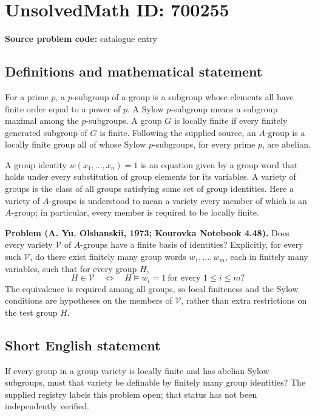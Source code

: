 \documentclass[11pt]{article}
\begin{document}
\section*{UnsolvedMath ID: 700255}
\textbf{Source problem code:} catalogue entry
\subsection{Definitions and mathematical statement}
For a prime \(p\), a \(p\)-subgroup of a group is a subgroup whose elements all have finite order equal to a power of \(p\). A Sylow \(p\)-subgroup means a subgroup maximal among the \(p\)-subgroups. A group \(G\) is locally finite if every finitely generated subgroup of \(G\) is finite. Following the supplied source, an \(A\)-group is a locally finite group all of whose Sylow \(p\)-subgroups, for every prime \(p\), are abelian.

A group identity \(w(x_1,\ldots,x_n)=1\) is an equation given by a group word that holds under every substitution of group elements for its variables. A variety of groups is the class of all groups satisfying some set of group identities. Here a variety of \(A\)-groups is understood to mean a variety every member of which is an \(A\)-group; in particular, every member is required to be locally finite.

\textbf{Problem (A. Yu. Olshanskii, 1973; Kourovka Notebook 4.48).} Does every variety \(\mathcal V\) of \(A\)-groups have a finite basis of identities? Explicitly, for every such \(\mathcal V\), do there exist finitely many group words \(w_1,\ldots,w_m\), each in finitely many variables, such that for every group \(H\),
\[
H\in\mathcal V
\quad\Longleftrightarrow\quad
H\models w_i=1\ \text{for every }1\leq i\leq m?
\]
The equivalence is required among all groups, so local finiteness and the Sylow conditions are hypotheses on the members of \(\mathcal V\), rather than extra restrictions on the test group \(H\).
\subsection{Short English statement}
If every group in a group variety is locally finite and has abelian Sylow subgroups, must that variety be definable by finitely many group identities? The supplied registry labels this problem open; that status has not been independently verified.
\end{document}
